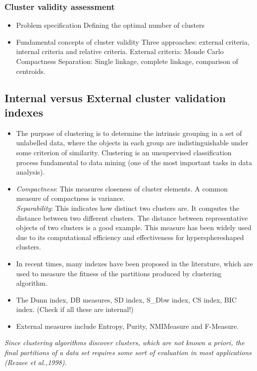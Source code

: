 \documentclass[a4paper,10pt]{article}
\begin{document}
\subsubsection{Cluster validity assessment}
\begin{itemize}
	\item Problem specification
		\subitem Defining the optimal number of clusters
	\item Fundamental concepts of cluster validity
		\subitem Three approaches: external criteria, internal criteria and relative criteria.
			\subsubitem External criteria: Monde Carlo
		\subitem Compactness
		\subitem Separation: Single linkage, complete linkage, comparison of centroids.
\end{itemize}

\subsection{Internal versus External cluster validation indexes}
\begin{itemize}
	\item The purpose of clustering is to determine the intrinsic grouping in a set of unlabelled data, where the objects in each group are indistinguishable under some criterion of similarity. Clustering is an unsupervised classification process fundamental to data mining (one of the most important tasks in data analysis).
	
	\item \textit{Compactness}: This measures closeness of cluster elements. A common measure of compactness is variance.\\
	\textit{Separability}: This indicates how distinct two clusters are. It computes the distance between two different clusters. The distance between representative objects of two clusters is a good example. This measure has been widely used due to its computational efficiency and effectiveness for hypersphereshaped clusters.
	\item In recent times, many indexes have been proposed in the literature, which are used to measure the fitness of the partitions produced by clustering algorithm.
	\item The Dunn index, DB measures, SD index, S\_Dbw index, CS index, BIC index. (Check if all these are internal!)
	\item External measures include Entropy, Purity, NMIMeasure and F-Measure.
\end{itemize}
\textit{Since clustering algorithms discover clusters, which are not known a priori, the final partitions of a data set requires some sort of evaluation in most applications (Rezaee et al.,1998).}
\end{document}

